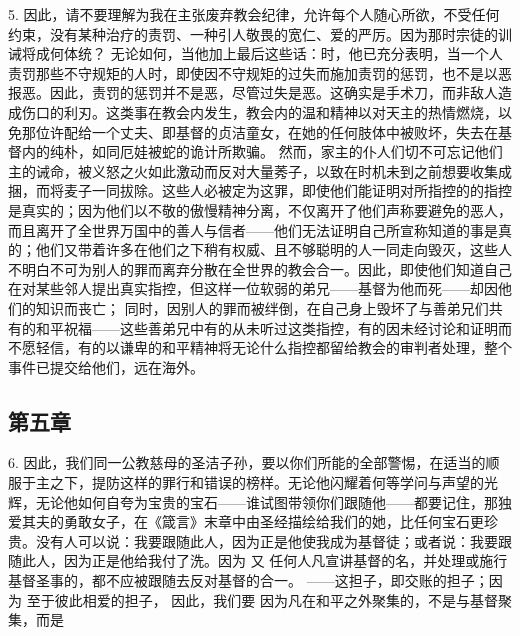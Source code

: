 5. 因此，请不要理解为我在主张废弃教会纪律，允许每个人随心所欲，不受任何约束，没有某种治疗的责罚、一种引人敬畏的宽仁、爱的严厉。因为那时宗徒的训诫将成何体统？  无论如何，当他加上最后这些话：时，他已充分表明，当一个人责罚那些不守规矩的人时，即使因不守规矩的过失而施加责罚的惩罚，也不是以恶报恶。因此，责罚的惩罚并不是恶，尽管过失是恶。这确实是手术刀，而非敌人造成伤口的利刃。这类事在教会内发生，教会内的温和精神以对天主的热情燃烧，以免那位许配给一个丈夫、即基督的贞洁童女，在她的任何肢体中被败坏，失去在基督内的纯朴，如同厄娃被蛇的诡计所欺骗。 然而，家主的仆人们切不可忘记他们主的诫命，被义怒之火如此激动而反对大量莠子，以致在时机未到之前想要收集成捆，而将麦子一同拔除。这些人必被定为这罪，即使他们能证明对所指控的的指控是真实的；因为他们以不敬的傲慢精神分离，不仅离开了他们声称要避免的恶人，而且离开了全世界万国中的善人与信者——他们无法证明自己所宣称知道的事是真的；他们又带着许多在他们之下稍有权威、且不够聪明的人一同走向毁灭，这些人不明白不可为别人的罪而离弃分散在全世界的教会合一。因此，即使他们知道自己在对某些邻人提出真实指控，但这样一位软弱的弟兄——基督为他而死——却因他们的知识而丧亡； 同时，因别人的罪而被绊倒，在自己身上毁坏了与善弟兄们共有的和平祝福——这些善弟兄中有的从未听过这类指控，有的因未经讨论和证明而不愿轻信，有的以谦卑的和平精神将无论什么指控都留给教会的审判者处理，整个事件已提交给他们，远在海外。\par


\subsection{第五章}

6. 因此，我们同一公教慈母的圣洁子孙，要以你们所能的全部警惕，在适当的顺服于主之下，提防这样的罪行和错误的榜样。无论他闪耀着何等学问与声望的光辉，无论他如何自夸为宝贵的宝石——谁试图带领你们跟随他——都要记住，那独爱其夫的勇敢女子，在《箴言》末章中由圣经描绘给我们的她，比任何宝石更珍贵。没有人可以说：我要跟随此人，因为正是他使我成为基督徒；或者说：我要跟随此人，因为正是他给我付了洗。因为  又  任何人凡宣讲基督的名，并处理或施行基督圣事的，都不应被跟随去反对基督的合一。 ——这担子，即交账的担子；因为  至于彼此相爱的担子，  因此，我们要  因为凡在和平之外聚集的，不是与基督聚集，而是 \par

